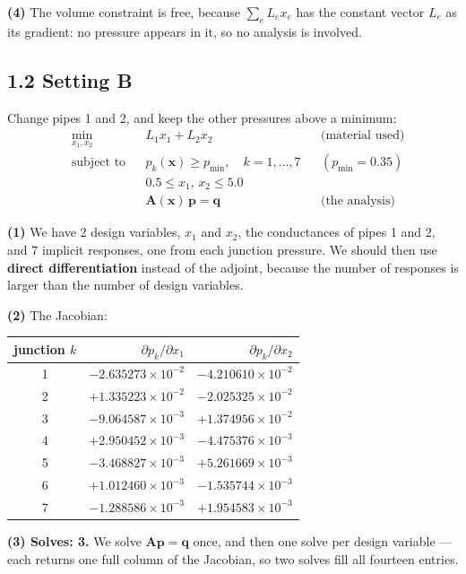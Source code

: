 \documentclass[11pt,a4paper]{article}
\begin{document}
\textbf{(4)} The volume constraint is free, because $\sum_e L_e x_e$ has the
constant vector $L_e$ as its gradient: no pressure appears in it, so no analysis
is involved.

\subsection*{1.2 Setting B}

Change pipes 1 and 2, and keep the other pressures above a minimum:
\[
  \begin{aligned}
    &\min_{x_1,x_2} && L_1x_1 + L_2x_2 && \text{(material used)}\\
    &\text{subject to} && p_k(\bm{x}) \ge p_{\min},\quad k = 1,\dots,7
      && (p_{\min} = 0.35)\\
    & && 0.5 \le x_1,\,x_2 \le 5.0 &&\\
    & && \bm{A}(\bm{x})\,\bm{p} = \bm{q} && \text{(the analysis)}
  \end{aligned}
\]

\textbf{(1)} We have 2 design variables, $x_1$ and $x_2$, the conductances of
pipes 1 and 2, and 7 implicit responses, one from each junction pressure. We
should then use \textbf{direct differentiation} instead of the adjoint, because
the number of responses is larger than the number of design variables.

\textbf{(2)} The Jacobian:

\begin{center}
\begin{tabular}{crr}
\toprule
junction $k$ & $\partial p_k/\partial x_1$ & $\partial p_k/\partial x_2$ \\
\midrule
1 & $-2.635273\times10^{-2}$ & $-4.210610\times10^{-2}$ \\
2 & $+1.335223\times10^{-2}$ & $-2.025325\times10^{-2}$ \\
3 & $-9.064587\times10^{-3}$ & $+1.374956\times10^{-2}$ \\
4 & $+2.950452\times10^{-3}$ & $-4.475376\times10^{-3}$ \\
5 & $-3.468827\times10^{-3}$ & $+5.261669\times10^{-3}$ \\
6 & $+1.012460\times10^{-3}$ & $-1.535744\times10^{-3}$ \\
7 & $-1.288586\times10^{-3}$ & $+1.954583\times10^{-3}$ \\
\bottomrule
\end{tabular}
\end{center}

\textbf{(3) Solves: 3.} We solve $\bm{A}\bm{p} = \bm{q}$ once, and then one solve
per design variable --- each returns one full column of the Jacobian, so two
solves fill all fourteen entries.
\end{document}
